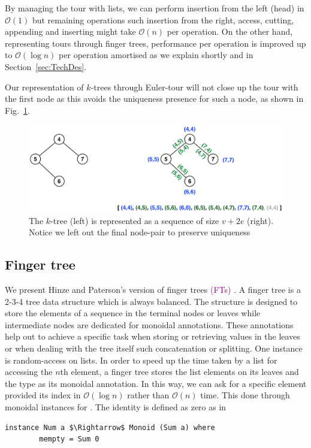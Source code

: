 \documentclass{elsarticle}
\newcommand{\code}[1]{\haskell{#1}}
\newcommand{\madd}[1]{\textcolor{Purple}{#1}}
\renewcommand{\O}{\ensuremath{\mathcal{O}}}
\begin{document}
By managing the tour with lists, we can perform insertion from the left (head) in $\O(1)$ but remaining operations such insertion from the right, access, cutting, appending and inserting might take $\O(n)$ per operation.
On the other hand, representing tours through finger trees, performance per operation is improved up to $\O(\log n)$ per operation amortised as we explain shortly and in Section~\ref{sec:TechDes}. 

Our representation of $k$-trees through Euler-tour will not close up the tour with the first node as this avoids the uniqueness presence for such a node, as shown in Fig.~\ref{fig:Euler-tour}.

\begin{figure}[H]
\begin{center}
\includegraphics[scale=0.35]{./Images/Euler-tour} 
\end{center}
\caption{The $k$-tree (left) is represented as a sequence of size $v+2e$ (right). Notice we left out the final node-pair to preserve uniqueness}
\label{fig:Euler-tour}
\end{figure}


\subsection{Finger tree} 

We present Hinze and Paterson's version of finger trees \madd{(FTs)} \cite{FTs}. A finger tree is a 2-3-4 tree data structure which is always balanced. The structure is designed to store the elements of a sequence in the terminal nodes or leaves while intermediate nodes are dedicated for monoidal annotations. These annotations help out to achieve a specific task when storing or retrieving values in the leaves or when dealing with the tree itself such concatenation or splitting. One instance is random-access on lists. In order to speed up the time taken by a list for accessing the $n$th element, a finger tree stores the list elements on its leaves and the type \code{Sum Int} as its monoidal annotation. In this way, we can ask for a specific element provided its index in $\O(\log n)$ rather than $\O(n)$ time. This done through monoidal instances for \code{Sum}. The identity is defined as zero as in 
\begin{lstlisting}[mathescape]
instance Num a $\Rightarrow$ Monoid (Sum a) where
        mempty = Sum 0
\end{lstlisting}
\end{document}
